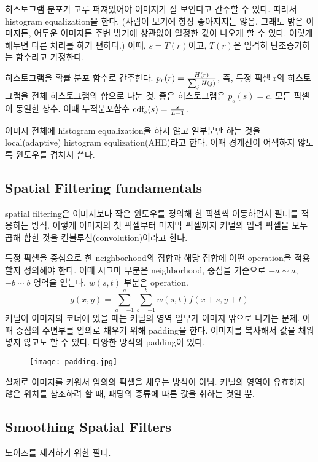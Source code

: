 히스토그램 분포가 고루 퍼져있어야 이미지가 잘 보인다고 간주할 수 있다. 따라서 histogram equalization을 한다. (사람이 보기에 항상 좋아지지는 않음. 그래도 밝은 이미지든, 어두운 이미지든 주변 밝기에 상관없이 일정한 값이 나오게 할 수 있다. 이렇게 해두면 다른 처리를 하기 편하다.) 이때, $s = T(r)$이고, $T(r)$은 엄격히 단조증가하는 함수라고 가정한다.

히스토그램을 확률 분포 함수로 간주한다. $p_r(r) = {H(r) \over {\sum_j H(j)}}$, 즉, 특정 픽셀 r의 히스토그램을 전체 히스토그램의 합으로 나눈 것. 좋은 히스토그램은 $p_s(s) = c$. 모든 픽셀이 동일한 상수. 이때 누적분포함수 $\text{cdf}_s(s) = {s \over L - 1}$.

이미지 전체에 histogram equalization을 하지 않고 일부분만 하는 것을 local(adaptive) histogram equlization(AHE)라고 한다. 이때 경계선이 어색하지 않도록 윈도우를 겹쳐서 쓴다.

\subsection{Spatial Filtering fundamentals}

spatial filtering은 이미지보다 작은 윈도우를 정의해 한 픽셀씩 이동하면서 필터를 적용하는 방식. 이렇게 이미지의 첫 픽셀부터 마지막 픽셀까지 커널의 입력 픽셀을 모두 곱해 합한 것을 컨볼루션(convolution)이라고 한다.

특정 픽셀을 중심으로 한 neighborhood의 집합과 해당 집합에 어떤 operation을 적용할지 정의해야 한다. 이때 시그마 부분은 neighborhood, 중심을 기준으로 $-a \sim a$, $-b \sim b$ 영역을 얻는다. $w(s, t)$ 부분은 operation.
$$
g(x, y) = \sum_{a=-1}^a \sum_{b=-1}^b w(s, t) f(x + s, y + t)
$$
커널이 이미지의 코너에 있을 때는 커널의 영역 일부가 이미지 밖으로 나가는 문제. 이때 중심의 주변부를 임의로 채우기 위해 padding을 한다. 이미지를 복사해서 값을 채워넣지 않고도 할 수 있다. 다양한 방식의 padding이 있다.

\begin{figure}[h]
  \centering
  \texttt{[image: padding.jpg]}
\end{figure}

실제로 이미지를 키워서 임의의 픽셀을 채우는 방식이 아님. 커널의 영역이 유효하지 않은 위치를 참조하려 할 때, 패딩의 종류에 따른 값을 취하는 것일 뿐.

\subsection{Smoothing Spatial Filters}

노이즈를 제거하기 위한 필터.

